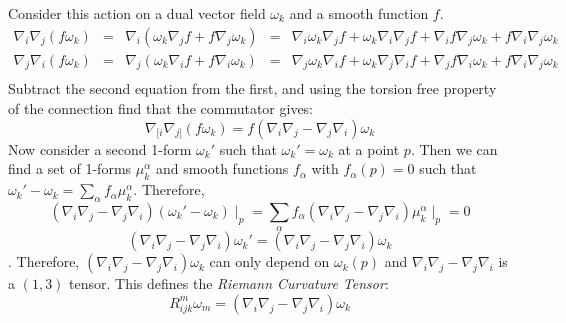 Consider this action on a dual vector field $\omega_k$ and a smooth function $f$.
\begin{equation}
\begin{array}{lcccl}
\nabla_i \nabla_j (f \omega_k) &=& \nabla_i(\omega_k \nabla_j f + f \nabla_j \omega_k) &=& \nabla_i \omega_k \nabla_j f + \omega_k \nabla_i \nabla_j f + \nabla_i f \nabla_j \omega_k + f \nabla_i \nabla_j \omega_k \\
\nabla_j \nabla_i (f \omega_k) &=& \nabla_j(\omega_k \nabla_i f + f \nabla_i \omega_k) &=& \nabla_j \omega_k \nabla_i f + \omega_k \nabla_j \nabla_i f + \nabla_j f \nabla_i \omega_k + f \nabla_i \nabla_j \omega_k \\
\end{array}
\end{equation}
Subtract the second equation from the first, and using the torsion free property of the connection find that the commutator gives:
\[ \nabla_{[i} \nabla_{j]} (f \omega_k) = f(\nabla_i \nabla_j - \nabla_j \nabla_i) \omega_k \]
Now consider a second 1-form $\omega_k'$ such that $\omega_k'=\omega_k$ at a point $p$. Then we can find a set of 1-forms $\mu_k^{\alpha}$ and smooth functions $f_{\alpha}$ with $f_{\alpha}(p)=0$ such that $\omega_k'-\omega_k=\sum_\alpha f_\alpha \mu^\alpha_k$. Therefore,
\[ (\nabla_i \nabla_j - \nabla_j \nabla_i) (\omega_k'-\omega_k)\mid_p=\sum_\alpha f_\alpha (\nabla_i \nabla_j - \nabla_j \nabla_i)\mu_k^\alpha \mid_p =0 \]
\[ (\nabla_i \nabla_j - \nabla_j \nabla_i)\omega_k'=(\nabla_i \nabla_j - \nabla_j \nabla_i)\omega_k\].
Therefore, $(\nabla_i \nabla_j - \nabla_j \nabla_i)\omega_k$ can only depend on $\omega_k (p)$ and $\nabla_i \nabla_j - \nabla_j \nabla_i$ is a $(1,3)$ tensor. This defines the \textit{Riemann Curvature Tensor}:
\begin{equation}\label{eq:Riedef}
R_{ijk}^{   m} \omega_m = (\nabla_i \nabla_j - \nabla_j \nabla_i)\omega_k
\end{equation}

